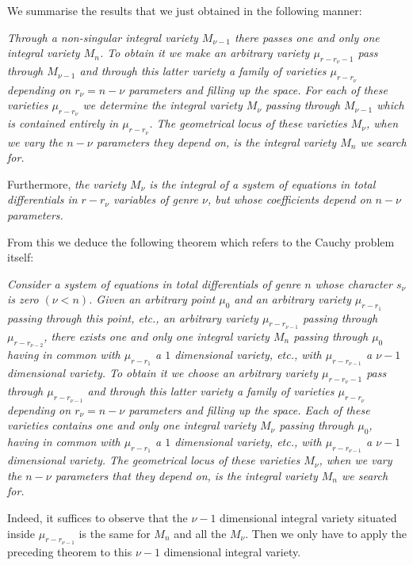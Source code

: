 \documentclass[leqno,11pt]{book}
\theoremstyle{shape1}
\theoremstyle{shapesmall}
\newcommand{\somespace}{\vspace{9pt}}
\begin{document}
We summarise the results that we just obtained in the following manner:

\somespace

\emph{Through a non-singular integral variety $M_{\nu-1}$ there passes one and only one integral variety $M_{n}$. To obtain it we make an arbitrary variety $\mu_{r-r_{\nu}-1}$ pass through $M_{\nu-1}$ and through this latter variety a family of varieties $\mu_{r-r_{\nu}}$ depending on $r_{\nu}=n-\nu$ parameters and filling up the space. For each of these varieties $\mu_{r-r_{\nu}}$ we determine the integral variety $M_{\nu}$ passing through $M_{\nu-1}$ which is contained entirely in $\mu_{r-r_{\nu}}$. The geometrical locus of these varieties $M_{\nu}$, when we vary the $n-\nu$ parameters they depend on, is the integral variety $M_{n}$ we search for.}

\somespace

Furthermore, \emph{the variety $M_{\nu}$ is the integral of a system of equations in total differentials in $r-r_{\nu}$ variables of genre $\nu$, but whose coefficients depend on $n-\nu$ parameters.}

From this we deduce the following theorem which refers to the Cauchy problem itself:

\somespace

\emph{Consider a system of equations in total differentials of genre $n$ whose character $s_{\nu}$ is zero $(\nu<n)$. Given an arbitrary point $\mu_{0}$ and an arbitrary variety $\mu_{r-r_{1}}$ passing through this point, etc., an arbitrary variety $\mu_{r-r_{\nu-1}}$ passing through $\mu_{r-r_{\nu-2}}$, there exists one and only one integral variety $M_{n}$ passing through $\mu_{0}$ having in common with $\mu_{r-r_{1}}$ a $1$ dimensional variety, etc., with $\mu_{r-r_{\nu-1}}$ a $\nu-1$ dimensional variety. To obtain it we choose an arbitrary variety $\mu_{r-r_{\nu}-1}$ pass through $\mu_{r-r_{\nu-1}}$ and through this latter variety a family of varieties $\mu_{r-r_{\nu}}$ depending on $r_{\nu}=n-\nu$ parameters and filling up the space. Each of these varieties contains one and only one integral variety $M_{\nu}$ passing through $\mu_{0}$, having in common with $\mu_{r-r_{1}}$ a $1$ dimensional variety, etc., with $\mu_{r-r_{\nu-1}}$ a $\nu-1$ dimensional variety. The geometrical locus of these varieties $M_{\nu}$, when we vary the $n-\nu$ parameters that they depend on, is the integral variety $M_{n}$ we search for.}

\somespace

Indeed, it suffices to observe that the $\nu-1$ dimensional integral variety situated inside $\mu_{r-r_{\nu-1}}$ is the same for $M_{n}$ and all the $M_{\nu}$. Then we only have to apply the preceding theorem to this $\nu-1$ dimensional integral variety.
\end{document}
